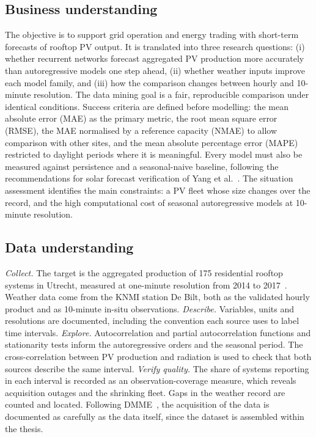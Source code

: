 \documentclass[11pt,a4paper]{article}
\begin{document}
\subsection{Business understanding}

The objective is to support grid operation and energy trading with short-term
forecasts of rooftop PV output. It is translated into three research questions:
(i) whether recurrent networks forecast aggregated PV production more accurately
than autoregressive models one step ahead, (ii) whether weather inputs improve
each model family, and (iii) how the comparison changes between hourly and
10-minute resolution. The data mining goal is a fair, reproducible comparison
under identical conditions. Success criteria are defined before modelling: the
mean absolute error (MAE) as the primary metric, the root mean square error
(RMSE), the MAE normalised by a reference capacity (NMAE) to allow comparison
with other sites, and the mean absolute percentage error (MAPE) restricted to
daylight periods where it is meaningful. Every model must also be measured
against persistence and a seasonal-naive baseline, following the
recommendations for solar forecast verification of Yang et al.~\cite{yang2020}.
The situation assessment identifies the main constraints: a PV fleet whose size
changes over the record, and the high computational cost of seasonal
autoregressive models at 10-minute resolution.

\subsection{Data understanding}

\emph{Collect.} The target is the aggregated production of 175 residential
rooftop systems in Utrecht, measured at one-minute resolution from 2014 to
2017~\cite{visser2022}. Weather data come from the KNMI station De Bilt, both as
the validated hourly product and as 10-minute in-situ observations.
\emph{Describe.} Variables, units and resolutions are documented, including the
convention each source uses to label time intervals. \emph{Explore.}
Autocorrelation and partial autocorrelation functions and stationarity tests
inform the autoregressive orders and the seasonal period. The cross-correlation
between PV production and radiation is used to check that both sources describe
the same interval. \emph{Verify quality.} The share of systems reporting in each
interval is recorded as an observation-coverage measure, which reveals
acquisition outages and the shrinking fleet. Gaps in the weather record are
counted and located. Following DMME~\cite{wiemer2019}, the acquisition of the
data is documented as carefully as the data itself, since the dataset is
assembled within the thesis.
\end{document}
